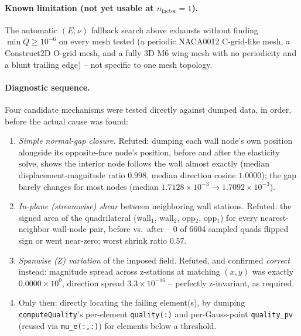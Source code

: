 \documentclass[11pt]{article}
\begin{document}
\paragraph{Known limitation (not yet usable at \(n_{\text{factor}}=1\)).}
The automatic \((E,\nu)\) fallback search above exhausts without finding
\(\min Q \geq 10^{-6}\) on every mesh tested (a periodic NACA0012
C-grid-like mesh, a Construct2D O-grid mesh, and a fully 3D M6 wing mesh
with no periodicity and a blunt trailing edge) -- not specific to one
mesh topology.

\paragraph{Diagnostic sequence.} Four candidate mechanisms were tested
directly against dumped data, in order, before the actual cause was
found:
\begin{enumerate}
\item \emph{Simple normal-gap closure.} Refuted: dumping each wall
  node's own position alongside its opposite-face node's position,
  before and after the elasticity solve, shows the interior node
  follows the wall almost exactly (median displacement-magnitude ratio
  \(0.998\), median direction cosine \(1.0000\)); the gap barely
  changes for most nodes (median \(1.7128\times10^{-3} \to
  1.7092\times10^{-3}\)).
\item \emph{In-plane (streamwise) shear} between neighboring wall
  stations. Refuted: the signed area of the quadrilateral
  (wall\(_1\), wall\(_2\), opp\(_2\), opp\(_1\)) for every nearest-
  neighbor wall-node pair, before vs.\ after -- 0 of 6604 sampled quads
  flipped sign or went near-zero; worst shrink ratio \(0.57\).
\item \emph{Spanwise (Z) variation} of the imposed field. Refuted, and
  confirmed \emph{correct} instead: magnitude spread across z-stations
  at matching \((x,y)\) was exactly \(0.0000\times10^{0}\), direction
  spread \(3.3\times10^{-16}\) -- perfectly z-invariant, as required.
\item Only then: directly locating the failing element(s), by dumping
  \texttt{computeQuality}'s per-element \texttt{quality(:)} and
  per-Gauss-point \texttt{quality\_pv} (reused via \texttt{mu\_e(:,:)})
  for elements below a threshold.
\end{enumerate}
\end{document}
